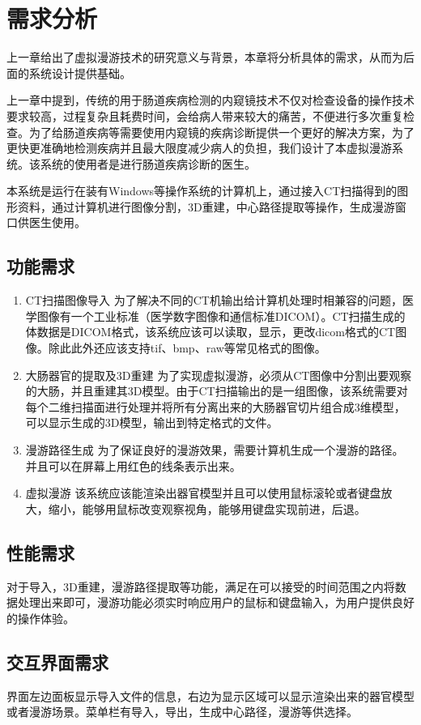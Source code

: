 \chapter{需求分析}
上一章给出了虚拟漫游技术的研究意义与背景，本章将分析具体的需求，从而为后面的系统设计提供基础。

上一章中提到，传统的用于肠道疾病检测的内窥镜技术不仅对检查设备的操作技术要求较高，过程复杂且耗费时间，会给病人带来较大的痛苦，不便进行多次重复检查。为了给肠道疾病等需要使用内窥镜的疾病诊断提供一个更好的解决方案，为了更快更准确地检测疾病并且最大限度减少病人的负担，我们设计了本虚拟漫游系统。该系统的使用者是进行肠道疾病诊断的医生。

本系统是运行在装有Windows等操作系统的计算机上，通过接入CT扫描得到的图形资料，通过计算机进行图像分割，3D重建，中心路径提取等操作，生成漫游窗口供医生使用。
\section{功能需求}

\begin{enumerate}
    \item CT扫描图像导入
为了解决不同的CT机输出给计算机处理时相兼容的问题，医学图像有一个工业标准（医学数字图像和通信标准DICOM）。CT扫描生成的体数据是DICOM格式，该系统应该可以读取，显示，更改dicom格式的CT图像。除此此外还应该支持tif、bmp、raw等常见格式的图像。
    \item 大肠器官的提取及3D重建
为了实现虚拟漫游，必须从CT图像中分割出要观察的大肠，并且重建其3D模型。由于CT扫描输出的是一组图像，该系统需要对每个二维扫描面进行处理并将所有分离出来的大肠器官切片组合成3维模型，可以显示生成的3D模型，输出到特定格式的文件。
    \item 漫游路径生成
为了保证良好的漫游效果，需要计算机生成一个漫游的路径。并且可以在屏幕上用红色的线条表示出来。
    \item 虚拟漫游
该系统应该能渲染出器官模型并且可以使用鼠标滚轮或者键盘放大，缩小，能够用鼠标改变观察视角，能够用键盘实现前进，后退。
\end{enumerate}

\section{性能需求}
对于导入，3D重建，漫游路径提取等功能，满足在可以接受的时间范围之内将数据处理出来即可，漫游功能必须实时响应用户的鼠标和键盘输入，为用户提供良好的操作体验。

\section{交互界面需求}
界面左边面板显示导入文件的信息，右边为显示区域可以显示渲染出来的器官模型或者漫游场景。菜单栏有导入，导出，生成中心路径，漫游等供选择。
